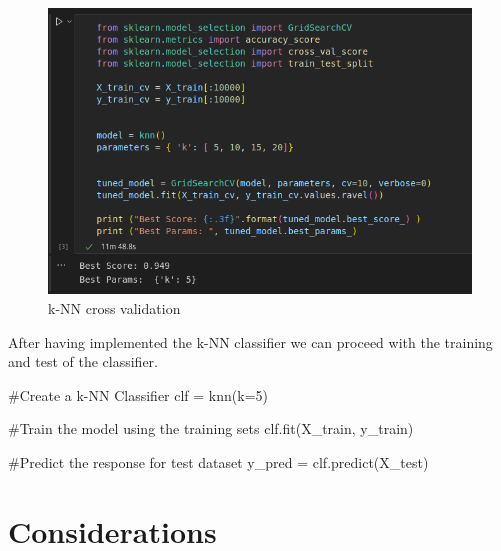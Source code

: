 \documentclass[12pt]{article}
\begin{document}
\begin{figure}[H]
    \centering
    \includegraphics[scale=0.6]{knn_cross.png}
    \caption{k-NN cross validation}
    \label{fig:knn_cross}
\end{figure}

After having implemented the k-NN classifier we can proceed with the training and 
test of the classifier.

\begin{python}[caption={k-NN predict method},label={lst:knn_predict}]
#Create a k-NN Classifier
clf = knn(k=5) 

#Train the model using the training sets
clf.fit(X_train, y_train)

#Predict the response for test dataset
y_pred = clf.predict(X_test)
\end{python}

\section{Considerations}
\end{document}
